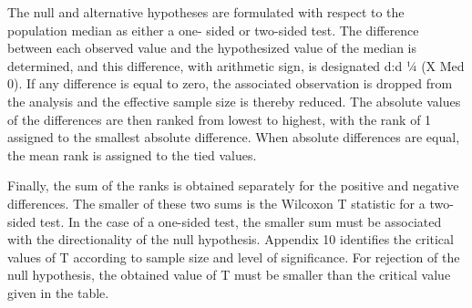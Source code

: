 The null and alternative hypotheses are formulated with respect to the population median as either a one-
sided or two-sided test. The difference between each observed value and the hypothesized value of the median
is determined, and this difference, with arithmetic sign, is designated d:d ¼ (X  Med 0). If any difference is
equal to zero, the associated observation is dropped from the analysis and the effective sample size is thereby
reduced. The absolute values of the differences are then ranked from lowest to highest, with the rank of 1
assigned to the smallest absolute difference. When absolute differences are equal, the mean rank is assigned to
the tied values. 

Finally, the sum of the ranks is obtained separately for the positive and negative differences. The
smaller of these two sums is the Wilcoxon T statistic for a two-sided test. In the case of a one-sided test, the
smaller sum must be associated with the directionality of the null hypothesis. Appendix 10 identifies the critical
values of T according to sample size and level of significance. For rejection of the null hypothesis, the obtained
value of T must be smaller than the critical value given in the table.


